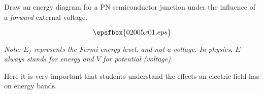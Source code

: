  

Draw an energy diagram for a PN semiconductor junction under the influence of a {\it forward} external voltage.







$$\epsfbox{02005x01.eps}$$

{\it Note: $E_f$ represents the Fermi energy level, and not a voltage.  In physics, $E$ always stands for energy and $V$ for potential (voltage).} 







Here it is very important that students understand the effects an electric field has on energy bands.




